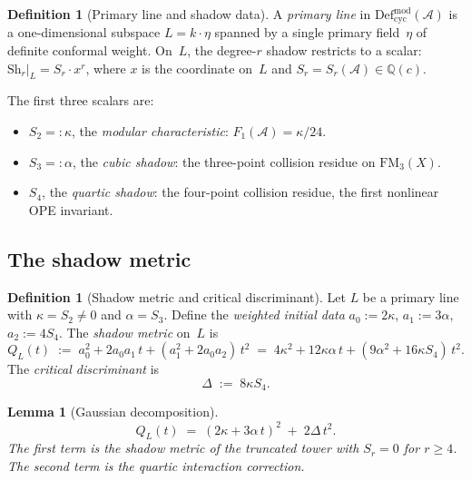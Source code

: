 \documentclass[11pt,reqno]{amsart}
\newtheorem{lemma}[theorem]{Lemma}
\theoremstyle{definition}
\newtheorem{definition}[theorem]{Definition}
\theoremstyle{remark}
\newcommand{\cA}{\mathcal{A}}
\newcommand{\Defcyc}{\mathrm{Def}_{\mathrm{cyc}}}
\newcommand{\Sh}{\mathrm{Sh}}
\newcommand{\FM}{\mathrm{FM}}
\numberwithin{equation}{section}
\begin{document}
\begin{definition}[Primary line and shadow
data]\label{def:primary-line}
A \emph{primary line} in $\Defcyc^{\mathrm{mod}}(\cA)$ is a
one-dimensional subspace $L = k \cdot \eta$ spanned by a
single primary field~$\eta$ of definite conformal weight.
On~$L$, the degree-$r$ shadow restricts to a scalar:
$\Sh_r|_L = S_r \cdot x^r$, where $x$ is the coordinate
on~$L$ and $S_r = S_r(\cA) \in \mathbb{Q}(c)$.

The first three scalars are:
\begin{itemize}
\item $S_2 =: \kappa$, the \emph{modular characteristic}:
 $F_1(\cA) = \kappa/24$.
\item $S_3 =: \alpha$, the \emph{cubic shadow}:
 the three-point collision residue on $\FM_3(X)$.
\item $S_4$, the \emph{quartic shadow}:
 the four-point collision residue, the first
 nonlinear OPE invariant.
\end{itemize}
\end{definition}

\subsection{The shadow metric}\label{subsec:shadow-metric}

\begin{definition}[Shadow metric and critical
discriminant]\label{def:shadow-metric}
Let $L$ be a primary line with $\kappa = S_2 \ne 0$ and
$\alpha = S_3$. Define the \emph{weighted initial data}
$a_0 := 2\kappa$, $a_1 := 3\alpha$, $a_2 := 4S_4$.
The \emph{shadow metric} on~$L$ is
\begin{equation}\label{eq:shadow-metric}
 Q_L(t)
 \;:=\;
 a_0^2 + 2a_0 a_1\,t + (a_1^2 + 2a_0 a_2)\,t^2
 \;=\;
 4\kappa^2 + 12\kappa\alpha\,t
 + (9\alpha^2 + 16\kappa S_4)\,t^2.
\end{equation}
The \emph{critical discriminant} is
\begin{equation}\label{eq:critical-disc}
 \Delta \;:=\; 8\kappa S_4.
\end{equation}
\end{definition}

\begin{lemma}[Gaussian decomposition]\label{lem:gaussian}
\begin{equation}\label{eq:gaussian-decomp}
 Q_L(t)
 \;=\;
 (2\kappa + 3\alpha\,t)^2
 \;+\;
 2\Delta\,t^2.
\end{equation}
The first term is the shadow metric of the truncated tower
with $S_r = 0$ for $r \ge 4$. The second term is the
quartic interaction correction.
\end{lemma}
\end{document}
